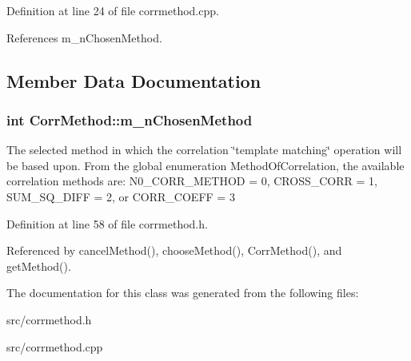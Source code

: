 Definition at line 24 of file corrmethod.cpp.

References m\_\-nChosenMethod.

\subsection{Member Data Documentation}
\hypertarget{classCorrMethod_a3e64e1a2c9eabff57b7e58eaff13f45f}{
\subsubsection[{m\_\-nChosenMethod}]{\setlength{\rightskip}{0pt plus 5cm}int {\bf CorrMethod::m\_\-nChosenMethod}}}
\label{classCorrMethod_a3e64e1a2c9eabff57b7e58eaff13f45f}
The selected method in which the correlation \char`\"{}template matching\char`\"{} operation will be based upon. From the global enumeration MethodOfCorrelation, the available correlation methods are: N0\_\-CORR\_\-METHOD = 0, CROSS\_\-CORR = 1, SUM\_\-SQ\_\-DIFF = 2, or CORR\_\-COEFF = 3 

Definition at line 58 of file corrmethod.h.

Referenced by cancelMethod(), chooseMethod(), CorrMethod(), and getMethod().

The documentation for this class was generated from the following files:\begin{DoxyCompactItemize}
\item 
src/corrmethod.h\item 
src/corrmethod.cpp\end{DoxyCompactItemize}
